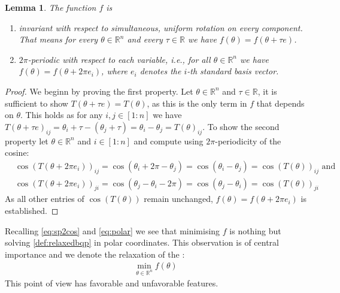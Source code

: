 \documentclass[12pt,a4paper]{article}
\theoremstyle{mythm}
\newtheorem{lem}[thm]{Lemma}
\begin{document}
\begin{lem}
\label{prop:propertiesf} 
The function $ f $ is 
\begin{enumerate}
\item 
invariant with respect to simultaneous, uniform rotation on every component. That means for every $ \theta \in \mathbb{R} ^{ n }  $ and every  $ \tau \in \mathbb{R}  $ we have $ f (\theta) = f (\theta + \tau e) $.
\item $ 2 \pi  $-periodic with respect to each variable, i.e., for all $ \theta \in \mathbb{R} ^{ n }  $ we have $ f ( \theta ) = f ( \theta + 2 \pi e_i)  $, where $ e_i $
denotes the $ i $-th standard basis vector.
\end{enumerate}
\end{lem} 
\begin{proof}
We beginn by proving the first property. Let $ \theta \in \mathbb{R} ^{ n }  $ and $ \tau \in \mathbb{R}  $, it is sufficient to show $ T ( \theta + \tau e) = T ( \theta) $,
as this is the only term in $ f $ that depends on $ \theta $.
This holds as for any $ i,j \in \left[ 1:n \right]  $ we have $T ( \theta + \tau e) _{ ij } =  \theta _{ i } + \tau - ( \theta _{ j } + \tau ) = \theta _{ i } - \theta _{ j } = T(
\theta) _{ ij }  $.
To show the second property let $ \theta \in \mathbb{R} ^{ n }  $ and $ i \in \left[ 1:n \right]  $ and compute using $ 2 \pi  $-periodicity of the cosine:
\begin{align*}
&\cos(   T ( \theta + 2 \pi e_i) )_{ ij } =  \cos( \theta_i + 2 \pi - \theta_j ) = \cos( \theta_i - \theta_j ) = \cos( T (\theta) ) _{ ij } \text{ and} \\
&\cos(   T ( \theta + 2 \pi e_i) )_{ ji } =  \cos( \theta_j - \theta_i - 2 \pi ) = \cos( \theta_j - \theta_i ) = \cos( T (\theta) ) _{ ji }
\end{align*} 
As all other entries of $ \cos( T(\theta) )   $ remain unchanged, $ f(\theta) = f(\theta+2\pi e_i) $ is established.
\end{proof}
Recalling \ref{eq:sp2cos} and \ref{eq:polar} we see that minimising $ f $ is nothing but solving \ref{def:relaxedbqp} in polar coordinates.
This observation is of central importance and we denote the relaxation of the \MCP:
\begin{align}
\label{def:minf}
\min_{\theta \in \mathbb{R} ^{ n } } f(\theta)
\end{align} 
This point of view has favorable and unfavorable features.
\end{document}
